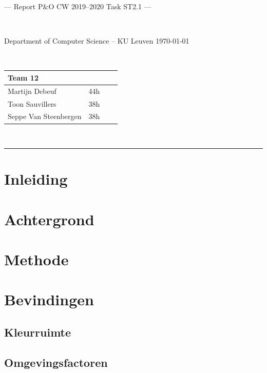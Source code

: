 \documentclass[a4paper,11pt]{article}
\begin{document}
\noindent
\colorbox[HTML]{52BDEC}{\bfseries\parbox{\textwidth}{\centering\large
  --- Report P\&O CW 2019--2020 Task ST2.1 ---
}}
\\[-1mm]
\colorbox[HTML]{00407A}{\bfseries\color{white}\parbox{\textwidth}{
  Department of Computer Science -- KU Leuven
  \hfill
  \today
}}
\\

\smallskip

\noindent
\begin{tabular}{*4l}
\toprule
\multicolumn{2}{l}{\large\textbf{Team 12}} \\
\midrule
Martijn Debeuf &  44h\\ %
Toon Sauvillers &  38h\\
Seppe Van Steenbergen & 38h\\
\bottomrule
\hline
\end{tabular}\\

\noindent
{\color[HTML]{52BDEC} \rule{\linewidth}{1mm} }

\tableofcontents
\newpage
\section{Inleiding}\label{sec:inleiding}
	

\section{Achtergrond}\label{sec:achtergrond}
	

\section{Methode}\label{sec:methode}
	

\section{Bevindingen}\label{sec:bevindingen}
	

	\subsection{Kleurruimte}\label{subsec:kleurruimte}
		
	\subsection{Omgevingsfactoren}\label{subsec:omgevingsfactoren}
		
	
\end{document}
